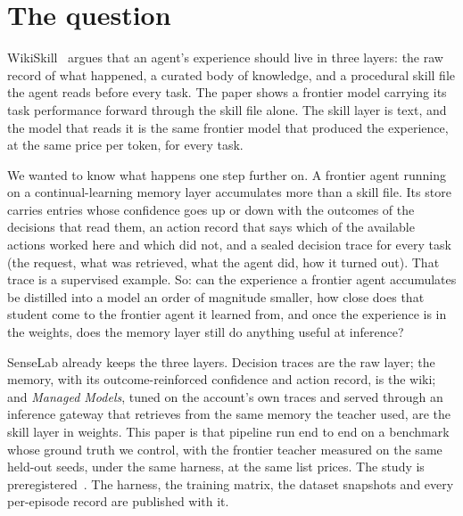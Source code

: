 \documentclass[11pt]{article}
\begin{document}
\section{The question}

WikiSkill~\cite{wikiskill} argues that an agent's experience should live in three layers: the
raw record of what happened, a curated body of knowledge, and a procedural skill file the
agent reads before every task. The paper shows a frontier model carrying its task
performance forward through the skill file alone. The skill layer is text, and the model
that reads it is the same frontier model that produced the experience, at the same price per
token, for every task.

We wanted to know what happens one step further on. A frontier agent running on a
continual-learning memory layer accumulates more than a skill file. Its store carries
entries whose confidence goes up or down with the outcomes of the decisions that read them,
an action record that says which of the available actions worked here and which did not,
and a sealed decision trace for every task (the request, what was retrieved, what the agent
did, how it turned out). That trace is a supervised example. So: can the experience a
frontier agent accumulates be distilled into a model an order of magnitude smaller, how
close does that student come to the frontier agent it learned from, and once the experience
is in the weights, does the memory layer still do anything useful at inference?

SenseLab already keeps the three layers. Decision traces are the raw layer; the memory,
with its outcome-reinforced confidence and action record, is the wiki; and \emph{Managed
Models}, tuned on the account's own traces and served through an inference gateway that
retrieves from the same memory the teacher used, are the skill layer in weights. This paper
is that pipeline run end to end on a benchmark whose ground truth we control, with the
frontier teacher measured on the same held-out seeds, under the same harness, at the same
list prices. The study is preregistered~\cite{prereg-distill}. The harness, the training
matrix, the dataset snapshots and every per-episode record are published with it.
\end{document}
